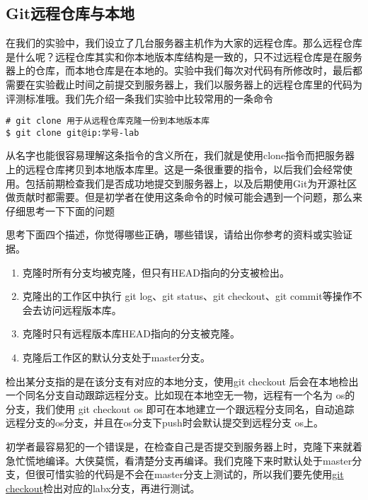 \subsection{Git远程仓库与本地}

在我们的实验中，我们设立了几台服务器主机作为大家的远程仓库。那么远程仓库是什么呢？远程仓库其实和你本地版本库结构是一致的，只不过远程仓库是在服务器上的仓库，而本地仓库是在本地的。实验中我们每次对代码有所修改时，最后都需要在实验截止时间之前提交到服务器上，我们以服务器上的远程仓库里的代码为评测标准哦。我们先介绍一条我们实验中比较常用的一条命令

\begin{verbatim}
# git clone 用于从远程仓库克隆一份到本地版本库
$ git clone git@ip:学号-lab
\end{verbatim}

从名字也能很容易理解这条指令的含义所在，我们就是使用clone指令而把服务器上的远程仓库拷贝到本地版本库里。这是一条很重要的指令，以后我们会经常使用。包括前期检查我们是否成功地提交到服务器上，以及后期使用Git为开源社区做贡献时都需要。但是初学者在使用这条命令的时候可能会遇到一个问题，那么来仔细思考一下下面的问题\par

\begin{thinking}\label{think-克隆}
思考下面四个描述，你觉得哪些正确，哪些错误，请给出你参考的资料或实验证据。
\begin{enumerate}
  \item 克隆时所有分支均被克隆，但只有HEAD指向的分支被检出。
  \item 克隆出的工作区中执行 git log、git status、git checkout、git commit等操作不会去访问远程版本库。
  \item 克隆时只有远程版本库HEAD指向的分支被克隆。
  \item 克隆后工作区的默认分支处于master分支。
\end{enumerate}
\end{thinking}

\begin{note}
检出某分支指的是在该分支有对应的本地分支，使用git checkout 后会在本地检出一个同名分支自动跟踪远程分支。比如现在本地空无一物，远程有一个名为 os的分支，我们使用 git checkout os 即可在本地建立一个跟远程分支同名，自动追踪远程分支的os分支，并且在os分支下push时会默认提交到远程分支 os上。
\end{note}

初学者最容易犯的一个错误是，在检查自己是否提交到服务器上时，克隆下来就着急忙慌地编译。大侠莫慌，看清楚分支再编译。我们克隆下来时默认处于master分支，但很可惜实验的代码是不会在master分支上测试的，所以我们要先使用\hyperref[git checkout]{git checkout}检出对应的labx分支，再进行测试。

